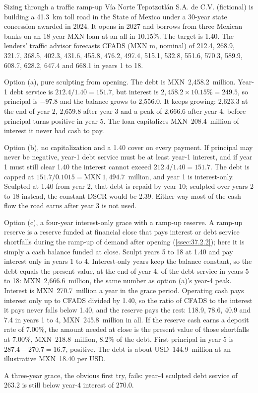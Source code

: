 \begin{example}{Sizing through a traffic ramp-up \illustrative}\label{ex:36.8}
Vía Norte Tepotzotlán S.A. de C.V. (fictional) is building a 41.3~km toll road in the State of Mexico under a 30-year state concession awarded in 2024. It opens in 2027 and borrows from three Mexican banks on an 18-year MXN loan at an all-in 10.15\%. The target is 1.40\x. The lenders' traffic advisor forecasts CFADS (MXN m, nominal) of 212.4, 268.9, 321.7, 368.5, 402.3, 431.6, 455.8, 476.2, 497.4, 515.1, 532.8, 551.6, 570.3, 589.9, 608.7, 628.2, 647.4 and 668.1 in years 1 to 18.

Option (a), pure sculpting from opening. The debt is MXN~2,458.2~million. Year-1 debt service is $212.4/1.40 = 151.7$, but interest is $2{,}458.2 \times 10.15\% = 249.5$, so principal is $-97.8$ and the balance grows to 2,556.0. It keeps growing: 2,623.3 at the end of year 2, 2,659.8 after year 3 and a peak of 2,666.6 after year 4, before principal turns positive in year 5. The loan capitalizes MXN~208.4~million of interest it never had cash to pay.

Option (b), no capitalization and a 1.40\x{} cover on every payment. If principal may never be negative, year-1 debt service must be at least year-1 interest, and if year 1 must still clear 1.40\x{} the interest cannot exceed $212.4/1.40 = 151.7$. The debt is capped at $151.7/0.1015 = \mathrm{MXN}~1{,}494.7$~million, and year 1 is interest-only. Sculpted at 1.40\x{} from year 2, that debt is repaid by year 10; sculpted over years 2 to 18 instead, the constant DSCR would be 2.39\x. Either way most of the cash flow the road earns after year 3 is not used.

Option (c), a four-year interest-only grace with a ramp-up reserve. A ramp-up reserve is a reserve funded at financial close that pays interest or debt service shortfalls during the ramp-up of demand after opening (\cref{ssec:37.2.2}); here it is simply a cash balance funded at close. Sculpt years 5 to 18 at 1.40\x{} and pay interest only in years 1 to 4. Interest-only years keep the balance constant, so the debt equals the present value, at the end of year 4, of the debt service in years 5 to 18: MXN~2,666.6~million, the same number as option (a)'s year-4 peak. Interest is MXN~270.7~million a year in the grace period. Operating cash pays interest only up to CFADS divided by 1.40, so the ratio of CFADS to the interest it pays never falls below 1.40\x, and the reserve pays the rest: 118.9, 78.6, 40.9 and 7.4 in years 1 to 4, MXN~245.8~million in all. If the reserve cash earns a deposit rate of 7.00\%, the amount needed at close is the present value of those shortfalls at 7.00\%, MXN~218.8~million, 8.2\% of the debt. First principal in year 5 is $287.4 - 270.7 = 16.7$, positive. The debt is about USD~144.9~million at an illustrative MXN~18.40 per USD.

A three-year grace, the obvious first try, fails: year-4 sculpted debt service of 263.2 is still below year-4 interest of 270.0.
\end{example}

